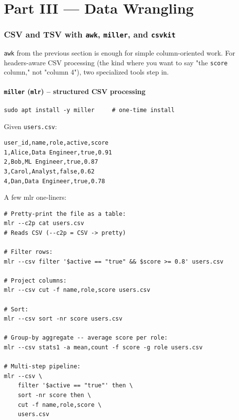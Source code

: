 \documentclass[11pt,a4paper]{article}
\begin{document}
\clearpage
\part*{Part III --- Data Wrangling}

\section{CSV and TSV with \texttt{awk}, \texttt{miller}, and \texttt{csvkit}}

\texttt{awk} from the previous section is enough for simple
column-oriented work. For headers-aware CSV processing (the kind
where you want to say "the \texttt{score} column," not "column 4"),
two specialized tools step in.

\subsection*{\texttt{miller} (\texttt{mlr}) -- structured CSV processing}

\begin{lstlisting}[style=bashstyle]
sudo apt install -y miller     # one-time install
\end{lstlisting}

Given \texttt{users.csv}:

\begin{lstlisting}[style=bashstyle]
user_id,name,role,active,score
1,Alice,Data Engineer,true,0.91
2,Bob,ML Engineer,true,0.87
3,Carol,Analyst,false,0.62
4,Dan,Data Engineer,true,0.78
\end{lstlisting}

A few mlr one-liners:

\begin{lstlisting}[style=bashstyle]
# Pretty-print the file as a table:
mlr --c2p cat users.csv
# Reads CSV (--c2p = CSV -> pretty)

# Filter rows:
mlr --csv filter '$active == "true" && $score >= 0.8' users.csv

# Project columns:
mlr --csv cut -f name,role,score users.csv

# Sort:
mlr --csv sort -nr score users.csv

# Group-by aggregate -- average score per role:
mlr --csv stats1 -a mean,count -f score -g role users.csv

# Multi-step pipeline:
mlr --csv \
    filter '$active == "true"' then \
    sort -nr score then \
    cut -f name,role,score \
    users.csv
\end{lstlisting}
\end{document}
